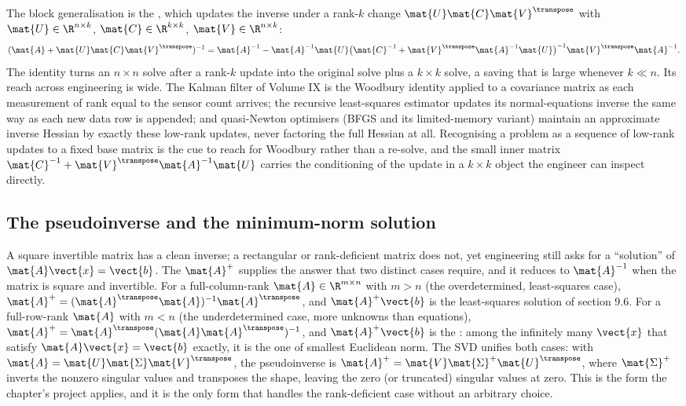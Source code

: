 \begin{mastery}
The block generalisation is the , which
updates the inverse under a rank-$k$ change $\mat{U}\mat{C}
\mat{V}^{\transpose}$ with $\mat{U} \in \R^{n \times k}$, $\mat{C} \in
\R^{k \times k}$, $\mat{V} \in \R^{n \times k}$:
\[
(\mat{A} + \mat{U}\mat{C}\mat{V}^{\transpose})^{-1} = \mat{A}^{-1} -
\mat{A}^{-1}\mat{U}\bigl(\mat{C}^{-1} + \mat{V}^{\transpose}\mat{A}^{-1}
\mat{U}\bigr)^{-1}\mat{V}^{\transpose}\mat{A}^{-1}.
\]
The identity turns an $n \times n$ solve after a rank-$k$ update into
the original solve plus a $k \times k$ solve, a saving that is large
whenever $k \ll n$. Its reach across engineering is wide. The Kalman
filter of Volume IX is the Woodbury identity applied to a covariance
matrix as each measurement of rank equal to the sensor count arrives;
the recursive least-squares estimator updates its normal-equations
inverse the same way as each new data row is appended; and quasi-Newton
optimisers (BFGS and its limited-memory variant) maintain an
approximate inverse Hessian by exactly these low-rank updates, never
factoring the full Hessian at all. Recognising a problem as a sequence
of low-rank updates to a fixed base matrix is the cue to reach for
Woodbury rather than a re-solve, and the small inner matrix $\mat{C}^{-1}
+ \mat{V}^{\transpose}\mat{A}^{-1}\mat{U}$ carries the conditioning of
the update in a $k \times k$ object the engineer can inspect directly.
\end{mastery}

\subsection{The pseudoinverse and the minimum-norm solution}

A square invertible matrix has a clean inverse; a rectangular or
rank-deficient matrix does not, yet engineering still asks for a
``solution'' of $\mat{A}\vect{x} = \vect{b}$. The
 $\mat{A}^{+}$ supplies the
answer that two distinct cases require, and it reduces to $\mat{A}^{-1}$
when the matrix is square and invertible. For a full-column-rank
$\mat{A} \in \R^{m \times n}$ with $m > n$ (the overdetermined,
least-squares case), $\mat{A}^{+} = (\mat{A}^{\transpose}\mat{A})^{-1}
\mat{A}^{\transpose}$, and $\mat{A}^{+}\vect{b}$ is the least-squares
solution of section 9.6. For a full-row-rank $\mat{A}$ with $m < n$
(the underdetermined case, more unknowns than equations), $\mat{A}^{+}
= \mat{A}^{\transpose}(\mat{A}\mat{A}^{\transpose})^{-1}$, and
$\mat{A}^{+}\vect{b}$ is the : among
the infinitely many $\vect{x}$ that satisfy $\mat{A}\vect{x} =
\vect{b}$ exactly, it is the one of smallest Euclidean norm. The SVD
unifies both cases: with $\mat{A} = \mat{U}\mat{\Sigma}\mat{V}^{\transpose}$,
the pseudoinverse is $\mat{A}^{+} = \mat{V}\mat{\Sigma}^{+}
\mat{U}^{\transpose}$, where $\mat{\Sigma}^{+}$ inverts the nonzero
singular values and transposes the shape, leaving the zero (or
truncated) singular values at zero. This is the form the chapter's
project applies, and it is the only form that handles the
rank-deficient case without an arbitrary choice.

